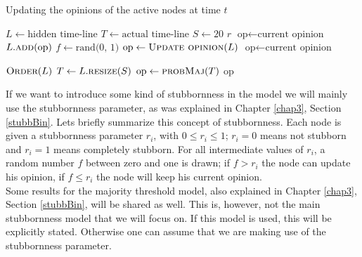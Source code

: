 \documentclass[11 pt , letterpaper , twoside , openright]{book}
\begin{document}
\begin{algorithm}
\caption{Updating the opinions of the active nodes at time $t$}
\label{alg:update}
\begin{algorithmic}[1]
	\State \(L \leftarrow \text{hidden time-line}\)
	\State \(T \leftarrow \text{actual time-line}\)
	\State \(S \leftarrow 20\) 
	\State \(r\) 
		\State \(\text{op} \leftarrow \text{current opinion}\)
		 
			\State \(L.\textsc{add}\text{(op)}\)
		\EndFor
		\State \(f \leftarrow \text{rand(0, 1)}\) 
			\State \(\text{op} \leftarrow \Call{Update opinion}{L}\) 
		\Else
			\State \(\text{op} \leftarrow \text{current opinion}\) 
		\EndIf
	\EndFor
	
		\State \(\textsc{Order}(L)\) 
			\State \(T \leftarrow L.\textsc{resize}(S)\) 
		\EndIf
		\State \(\text{op} \leftarrow \textsc{probMaj}(T)\) 
	\State \Return op 
	\EndFunction
\end{algorithmic}
\end{algorithm}
\noindent
If we want to introduce some kind of stubbornness in the model we will mainly use the stubbornness parameter, as was explained in Chapter \ref{chap3}, Section \ref{stubbBin}. Lets briefly summarize this concept of stubbornness. Each node is given a stubbornness parameter $r_i$, with $0 \leqslant r_i \leqslant 1$; $r_i = 0$ means not stubborn and $r_i = 1$ means completely stubborn. For all intermediate values of $r_i$, a random number $f$ between zero and one is drawn; if $f > r_i$ the node can update his opinion, if $f \leqslant r_i$ the node will keep his current opinion.\\
\newline
Some results for the majority threshold model, also explained in Chapter \ref{chap3}, Section \ref{stubbBin}, will be shared as well. This is, however, not the main stubbornness model that we will focus on. If this model is used, this will be explicitly stated. Otherwise one can assume that we are making use of the stubbornness parameter.\\
\end{document}
